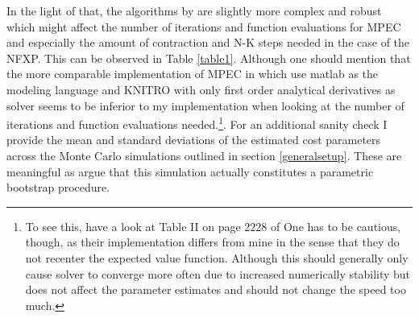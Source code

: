 In the light of that, the algorithms by \citeauthor{Iskhakov.2016} are slightly more complex and robust which might affect the number of iterations and function evaluations for MPEC and especially the amount of contraction and N-K steps needed in the case of the NFXP. This can be observed in Table \ref{table1}. Although one should mention that the more comparable implementation of MPEC in which \cite{Su.Judd.2012} use matlab as the modeling language and KNITRO with only first order analytical derivatives as solver seems to be inferior to my implementation when looking at the number of iterations and function evaluations needed.\footnote{ To see this, have a look at Table II on page 2228 of \cite{Su.Judd.2012} One has to be cautious, though, as their implementation differs from mine in the sense that they do not recenter the expected value function. Although this should generally only cause solver to converge more often due to increased numerically stability but does not affect the parameter estimates and should not change the speed too much.}. For an additional sanity check I provide the mean and standard deviations of the estimated cost parameters across the Monte Carlo simulations outlined in section \ref{generalsetup}. These are meaningful as \cite{Su.Judd.2012} argue that this simulation actually constitutes a parametric bootstrap procedure.

